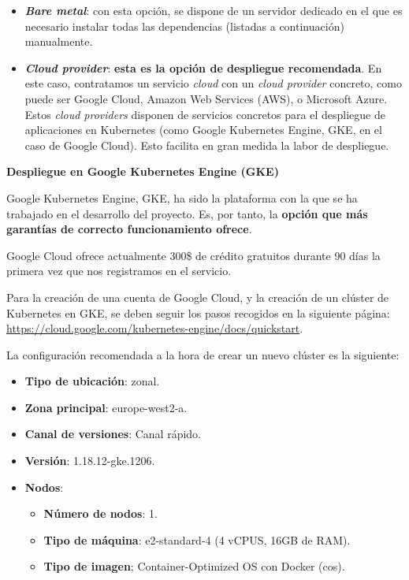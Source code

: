 \vspace{-0.2cm}
\begin{itemize} [\textbullet]
	\item \textbf{\emph{Bare metal}}: con esta opción, se dispone de un servidor dedicado en el que es necesario instalar todas las dependencias (listadas a continuación) manualmente.

	\item \textbf{\emph{Cloud provider}}: \textbf{esta es la opción de despliegue recomendada}. En este caso, contratamos un servicio \emph{cloud} con un \emph{cloud provider} concreto, como puede ser Google Cloud, Amazon Web Services (AWS), o Microsoft Azure. Estos \emph{cloud providers} disponen de servicios concretos para el despliegue de aplicaciones en Kubernetes (como Google Kubernetes Engine, GKE, en el caso de Google Cloud). Esto facilita en gran medida la labor de despliegue.
\end{itemize}

\vspace{0.3cm}
\noindent
\textbf{Despliegue en Google Kubernetes Engine (GKE)}

Google Kubernetes Engine, GKE, ha sido la plataforma con la que se ha trabajado en el desarrollo del proyecto. Es, por tanto, la \textbf{opción que más garantías de correcto funcionamiento ofrece}.

Google Cloud ofrece actualmente 300\$ de crédito gratuitos durante 90 días la primera vez que nos registramos en el servicio.

Para la creación de una cuenta de Google Cloud, y la creación de un clúster de Kubernetes en GKE, se deben seguir los pasos recogidos en la siguiente página: \href{https://cloud.google.com/kubernetes-engine/docs/quickstart}{https://cloud.google.com/kubernetes-engine/docs/quickstart}.

La configuración recomendada a la hora de crear un nuevo clúster es la siguiente:

\vspace{-0.2cm}
\begin{itemize} [\textbullet]
	\tightlist
	\item \textbf{Tipo de ubicación}: zonal.
	\item \textbf{Zona principal}: europe-west2-a.
	\item \textbf{Canal de versiones}: Canal rápido.
	\item \textbf{Versión}: 1.18.12-gke.1206.
	\item \textbf{Nodos}:
	\begin{itemize} [◦]
		\tightlist
		\item \textbf{Número de nodos}: 1.
		\item \textbf{Tipo de máquina}: e2-standard-4 (4 vCPUS, 16GB de RAM).
		\item \textbf{Tipo de imagen}; Container-Optimized OS con Docker (cos).
	\end{itemize}
\end{itemize}


